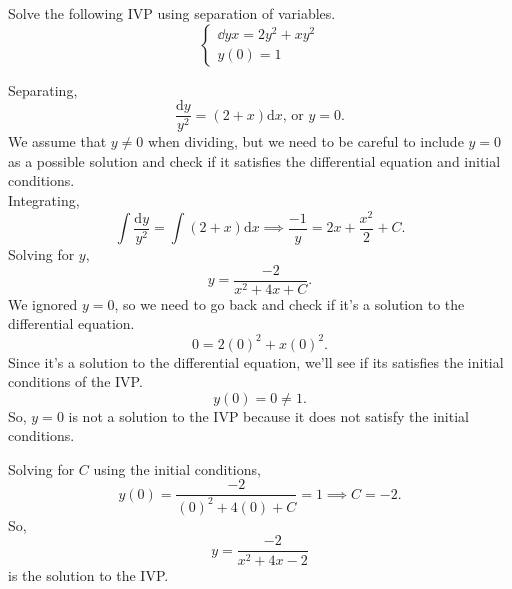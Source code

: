 \begin{example}
	Solve the following IVP using separation of variables.
	\begin{equation*}
		\begin{cases}
			\dd{y}{x} = 2y^2 + xy^2 \\
			y(0) = 1
		\end{cases}
	\end{equation*}
\end{example}
\noindent
Separating,
\begin{equation*}
	\frac{\mathrm{d}y}{y^2} = \left(2 + x\right) \mathrm{d}x \text{, or } y = 0.
\end{equation*}
We assume that $y \neq 0$ when dividing, but we need to be careful to include $y = 0$ as a possible solution and check if it satisfies the differential equation and initial conditions.\\

\noindent
Integrating,
\begin{equation*}
	\int{\frac{\mathrm{d}y}{y^2}} = \int{\left(2 + x\right) \mathrm{d}x} \implies \frac{-1}{y} = 2x + \frac{x^2}{2} + C.
\end{equation*}
Solving for $y$,
\begin{equation*}
	y = \frac{-2}{x^2 + 4x + C}.
\end{equation*}
We ignored $y = 0$, so we need to go back and check if it's a solution to the differential equation.
\begin{equation*}
	0 = 2(0)^2 + x(0)^2.
\end{equation*}
Since it's a solution to the differential equation, we'll see if its satisfies the initial conditions of the IVP.
\begin{equation*}
	y(0) = 0 \neq 1.
\end{equation*}
So, $y = 0$ is not a solution to the IVP because it does not satisfy the initial conditions.

\noindent
Solving for $C$ using the initial conditions,
\begin{equation*}
	y(0) = \frac{-2}{(0)^2 + 4(0) + C} = 1 \implies C = -2.
\end{equation*}
So,
\begin{equation*}
	y = \frac{-2}{x^2 + 4x -2}
\end{equation*}
is the solution to the IVP.